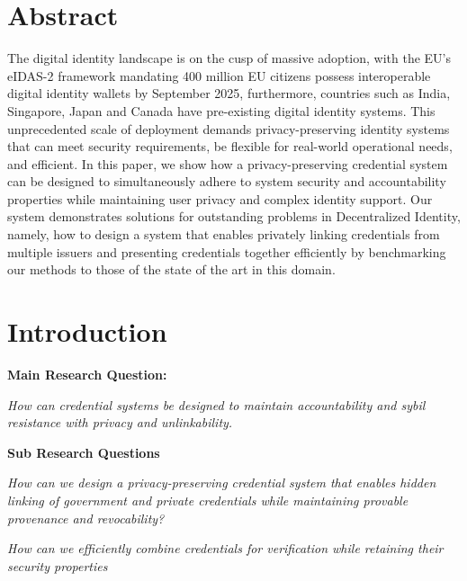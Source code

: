 \section{Abstract}
The digital identity landscape is on the cusp of massive adoption, with the EU's eIDAS-2 framework mandating 400 million EU citizens possess interoperable digital identity wallets by September 2025, furthermore, countries such as India, Singapore, Japan and Canada have pre-existing digital identity systems. This unprecedented scale of deployment demands privacy-preserving identity systems that can meet security requirements, be flexible for real-world operational needs, and efficient. In this paper, we show how a privacy-preserving credential system can be designed to simultaneously adhere to system security and accountability properties while maintaining user privacy and complex identity support. 
Our system demonstrates solutions for outstanding problems in Decentralized Identity, namely, how to design a system that enables privately linking credentials from multiple issuers and presenting credentials together efficiently by benchmarking our methods to those of the state of the art in this domain.

\section{Introduction}

\textbf{Main Research Question: }

\textit{How can credential systems be designed to maintain accountability and sybil resistance with privacy and unlinkability. }

\noindent \textbf{Sub Research Questions}

\textit{How can we design a privacy-preserving credential system that enables hidden linking of government and private credentials while maintaining provable provenance and revocability?}

\textit{How can we efficiently combine credentials for verification while retaining their security properties}


